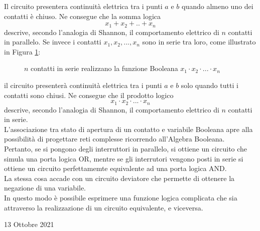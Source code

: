 \documentclass[a4paper]{extarticle}
\begin{document}
\noindent
Il circuito presentera continuità elettrica tra i punti $a$ e $b$ quando almeno uno dei contatti è chiuso. Ne consegue che la somma logica
\[x_1 + x_2 + .. + x_n\]
descrive, secondo l’analogia di Shannon, il comportamento elettrico di $n$ contatti in parallelo.
Se invece i contatti \(x_1, x_2, ..., x_n\) sono in serie tra loro, come illustrato in Figura \ref{fig:contatti_serie}:

\begin{figure}[H]
    \centering
    \caption{$n$ contatti in serie realizzano la funzione Booleana \(x_1 \cdot x_2 \cdot ... \cdot x_n\)}
    \label{fig:contatti_serie}
\end{figure}

\noindent
il circuito presenterà continuità elettrica tra i punti $a$ e $b$ solo quando tutti i contatti sono chiusi. Ne consegue che il prodotto logico
\[x_1 \cdot x_2 \cdot ... \cdot x_n\]
descrive, secondo l’analogia di Shannon, il comportamento elettrico di $n$ contatti in serie.\\
L’associazione tra stato di apertura di un contatto e variabile Booleana apre alla possibilità di progettare reti complesse ricorrendo all’Algebra Booleana.\\
Pertanto, se si pongono degli interruttori in parallelo, si ottiene un circuito che simula una porta logica OR, mentre se gli interrutori vengono posti in serie si ottiene un circuito perfettamemte equivalente ad una porta logica AND.\\
La stessa cosa accade con un circuito deviatore che permette di ottenere la negazione di una variabile.\\
In questo modo è possibile esprimere una funzione logica complicata che sia attraverso la realizzazione di un circuito equivalente, e viceversa.

\newpage
\begin{center}
    13 Ottobre 2021
\end{center}
\end{document}

